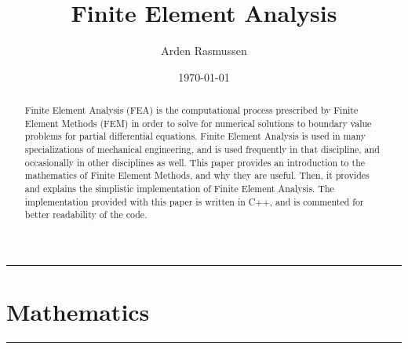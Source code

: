 \documentclass[10pt]{armath}
\title{Finite Element Analysis}
\author{Arden Rasmussen}
\date{\today}
\numberwithin{equation}{section}
\theoremstyle{definition}
\newcommand{\hdiv}[3]{
  \vspace{#1}%
  \noindent\rule{\textwidth}{#2}%
  \vspace{#3}%
}
\begin{document}
\maketitle

\begin{abstract}
  Finite Element Analysis (FEA) is the computational process prescribed by
  Finite Element Methods (FEM) in order to solve for numerical solutions to
  boundary value problems for partial differential equations. Finite Element
  Analysis is used in many specializations of mechanical engineering, and is
  used frequently in that discipline, and occasionally in other disciplines as
  well. This paper provides an introduction to the mathematics of Finite
  Element Methods, and why they are useful. Then, it provides and explains the
  simplistic implementation of Finite Element Analysis. The implementation
  provided with this paper is written in C++, and is commented for better
  readability of the code.
\end{abstract}

\begin{multicols}{2}
  
\end{multicols}

\newpage
\hdiv{10pt}{0.5pt}{1pt}
\part{Mathematics}%
\label{prt:mathematics}
\hdiv{1pt}{0.5pt}{10pt}

\begin{multicols}{2}

  
  
  
  
  

  \nocite{*}
  
  
\end{multicols}
\end{document}
